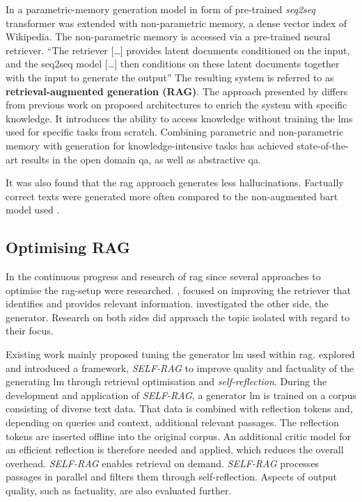 %
In \citet{lewis2020ragnlp} a parametric-memory generation model in form of pre-trained \textit{seq2seq} transformer was extended with non-parametric memory, a dense vector index of Wikipedia.
The non-parametric memory is accessed via a pre-trained neural retriever.
\enquote{The retriever [\dots] provides latent documents conditioned on
the input, and the seq2seq model [\dots] then conditions on these latent documents together with the input to generate the output} \citep[p.2]{lewis2020ragnlp}
The resulting system is referred to as \textbf{retrieval-augmented generation (RAG)}.
%
The approach presented by \citet{lewis2020ragnlp} differs from previous work on proposed architectures to enrich the system with specific knowledge. It introduces the ability to access knowledge without training the \acp{lm} used for specific tasks from scratch.
Combining parametric and non-parametric memory with generation for knowledge-intensive tasks has achieved state-of-the-art results in the open domain \ac{qa}, as well as abstractive \ac{qa}.

It was also found that the \ac{rag} approach generates less hallucinations. Factually correct texts were generated more often compared to the non-augmented \ac{bart} model used \citep{lewis2020ragnlp}.
%
\subsection{Optimising RAG}
In the continuous progress and research of \ac{rag} since \citet{lewis2020ragnlp} several approaches to optimise the \ac{rag}-setup were researched.
\citet{izacard2022unsupervised, Karpukhin2020DensePR}, focused on improving the retriever that identifies and provides relevant information.
\citet{Agarwal2024ManyShotIL, liu2024lostmiddle} investigated the other side, the generator.
Research on both sides did approach the topic isolated with regard to their focus.
%

%
Existing work mainly proposed tuning the generator \ac{lm} used within \ac{rag}. \citet{Asai2023SelfRAGLT} explored and introduced a framework, \textit{SELF-RAG} to improve quality and factuality of the generating \ac{lm} through retrieval optimisation and \textit{self-reflection}.
During the development and application of \textit{SELF-RAG}, a generator \ac{lm} is trained on a corpus consisting of diverse text data.
That data is combined with reflection tokens and, depending on queries and context, additional relevant passages. 
The reflection tokens are inserted offline into the original corpus.
An additional critic model for an efficient reflection is therefore needed and applied, which reduces the overall overhead.
\textit{SELF-RAG} enables retrieval on demand.
\textit{SELF-RAG} processes passages in parallel and filters them through self-reflection.
Aspects of output quality, such as factuality, are also evaluated further.

